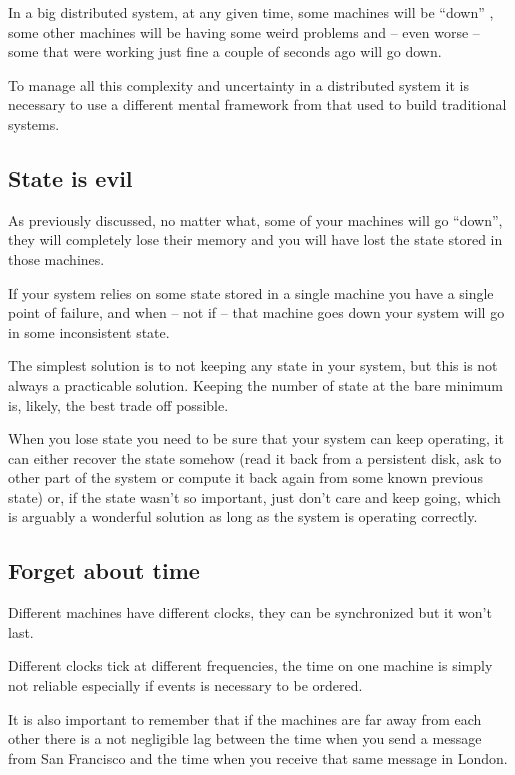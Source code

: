 \documentclass[12pt]{article} %
\begin{document}
In a big distributed system, at any given time, some machines will be ``down'' , some other machines will be having some weird problems and -- even worse -- some that were working just fine a couple of seconds ago will go down.

To manage all this complexity and uncertainty in a distributed system it is necessary to use a different mental framework from that used to build traditional systems.

	\subsection{State is evil}
	
As previously discussed, no matter what, some of your machines will go ``down'', they will completely lose their memory and you will have lost the state stored in those machines.

If your system relies on some state stored in a single machine you have a single point of failure, and when -- not if -- that machine goes down your system will go in some inconsistent state.

The simplest solution is to not keeping any state in your system, but this is not always a practicable solution. Keeping the number of state at the bare minimum is, likely, the best trade off possible.

When you lose state you need to be sure that your system can keep operating, it can either recover the state somehow (read it back from a persistent disk, ask to other part of the system or compute it back again from some known previous state) or, if the state wasn't so important, just don't care and keep going, which is arguably a wonderful solution as long as the system is operating correctly.

	\subsection{Forget about time}
	
Different machines have different clocks, they can be synchronized but it won't last.

Different clocks tick at different frequencies, the time on one machine is simply not reliable especially if events is necessary to be ordered.

It is also important to remember that if the machines are far away from each other there is a not negligible lag between the time when you send a message from San Francisco and the time when you receive that same message in London. 
\end{document}
